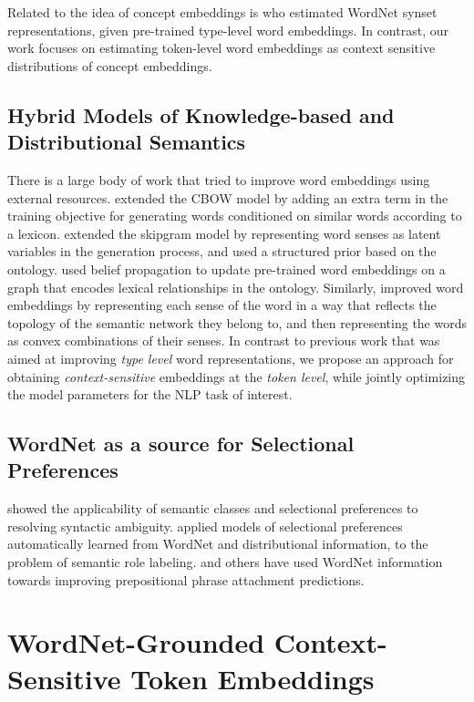 Related to the idea of concept embeddings is \cite{rothe:15} who estimated WordNet synset representations, given pre-trained type-level word embeddings.
In contrast, our work focuses on estimating token-level word embeddings as context sensitive distributions of concept embeddings.

\subsection{Hybrid Models of Knowledge-based and Distributional Semantics}
There is a large body of work that tried to improve word embeddings using external resources. \cite{yu:14} extended the CBOW model \cite{mikolov:13} by adding an extra term in the training objective for generating words conditioned on similar words according to a lexicon.
\cite{jauhar:15} extended the skipgram model \cite{mikolov:13} by representing word senses as latent variables in the generation process, and used a structured prior based on the ontology.
\cite{faruqui:15} used belief propagation to update pre-trained word embeddings on a graph that encodes lexical relationships in the ontology.
Similarly, \cite{johansson2015embedding} improved word embeddings by representing each sense of the word in a way that reflects the topology of the semantic network they belong to, and then representing the words as convex combinations of their senses.
In contrast to previous work that was aimed at improving \textit{type level} word representations, we propose an approach for obtaining \textit{context-sensitive} embeddings at the \textit{token level}, while jointly optimizing the model parameters for the NLP task of interest.

\subsection{WordNet as a source for Selectional Preferences}
\cite{resnik:93} showed the applicability of semantic classes and selectional preferences to resolving syntactic ambiguity. \cite{Zapirain2013SelectionalPF} applied models of selectional preferences automatically learned from WordNet and distributional information, to the problem of semantic role labeling. \cite{resnik:93,brill1994rule,agirre2008improving} and others have used WordNet information towards improving prepositional phrase attachment predictions.

\section{WordNet-Grounded Context-Sensitive Token Embeddings}
\label{sec:ontolstm_input_rep}

